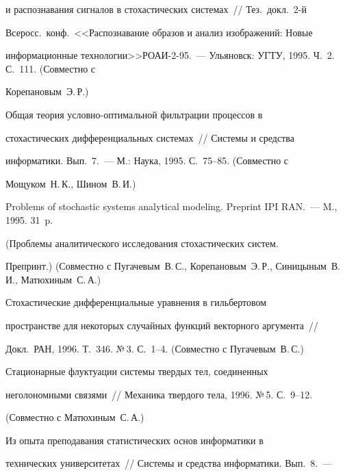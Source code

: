 и распознавания сигналов в стохастических системах~// Тез.\ докл.\ 2-й


Всеросс.\ конф.\ <<Распознавание образов и анализ изображений: Новые


информационные технологии>>\linebreak РОАИ-2-95.~--- Ульяновск: УГТУ, 1995. Ч.~2. С.~111. (Совместно с


Корепановым~Э.\,Р.)





 Общая теория условно-оптимальной фильтрации процессов в


стохастических дифференциальных системах~// Системы и средства


информатики. Вып.~7.~--- М.: Наука, 1995. С.~75--85. (Совместно с


Мощуком~Н.\,К., Шином~В.\,И.)





 Problems of stochastic systems analytical modeling. Preprint IPI RAN.~--- M., 1995. 31~p.


 (Проблемы аналитического исследования стохастических систем.


Препринт.) (Совместно с Пугачевым~В.\,С., Корепановым~Э.\,Р., Синицыным~В.\,И., Матюхиным~С.\,А.)


\vspace*{-3pt}










 Стохастические дифференциальные уравнения в гильбертовом


пространстве для некоторых случайных функций векторного аргумента~//


Докл.\ РАН, 1996. Т.~346. №\,3. С.~1--4. (Совместно с Пугачевым~В.\,С.)





 Стационарные флуктуации системы твердых тел, соединенных


неголономными связями~// Механика твердого тела, 1996. №\,5. С.~9--12.


(Совместно с Матюхиным~С.\,А.)





 Из опыта преподавания статистических основ информатики в


технических университетах~// Системы и средства информатики. Вып.~8.~---


